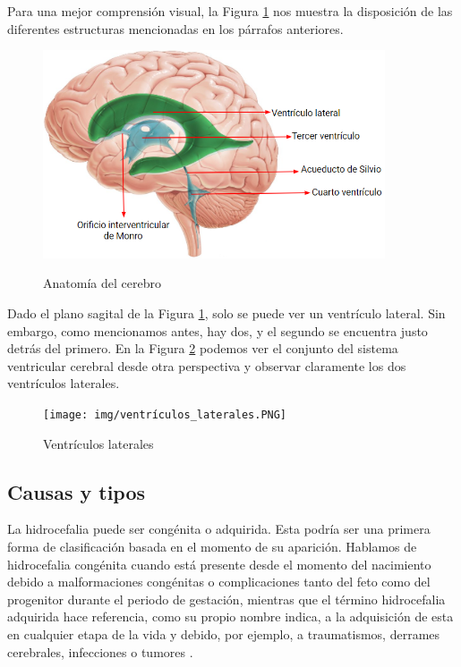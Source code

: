 Para una mejor comprensión visual, la Figura \ref{fig:anatomia_cerebro} nos muestra la disposición de las diferentes estructuras mencionadas en los párrafos anteriores.
\begin{figure}[h]
    \centering
    \includegraphics[width=0.9\textwidth]{img/anatomia_cerebro.PNG}
    \caption{Anatomía del cerebro}
     \cite{anatomia_cerebro}
    \label{fig:anatomia_cerebro}
\end{figure}

Dado el plano sagital de la Figura \ref{fig:anatomia_cerebro}, solo se puede ver un ventrículo lateral. Sin embargo, como mencionamos antes, hay dos, y el segundo se encuentra justo detrás del primero. En la Figura \ref{fig:ventrículos_laterales} podemos ver el conjunto del sistema ventricular cerebral desde otra perspectiva y observar claramente los dos ventrículos laterales.
\begin{figure}[h]
    \centering
    \texttt{[image: img/ventrículos\_laterales.PNG]}
    \caption{Ventrículos laterales}
    \cite{ventriculos_laterales}
    \label{fig:ventrículos_laterales}
\end{figure}

\subsection{Causas y tipos}
La hidrocefalia puede ser congénita o adquirida. Esta podría ser una primera forma de clasificación basada en el momento de su aparición. Hablamos de hidrocefalia congénita cuando está presente desde el momento del nacimiento debido a malformaciones congénitas o complicaciones tanto del feto como del progenitor durante el periodo de gestación, mientras que el término hidrocefalia adquirida hace referencia, como su propio nombre indica, a la adquisición de esta en cualquier etapa de la vida y debido, por ejemplo, a traumatismos, derrames cerebrales, infecciones o tumores \cite{tipos_hidrocefalia}. 

